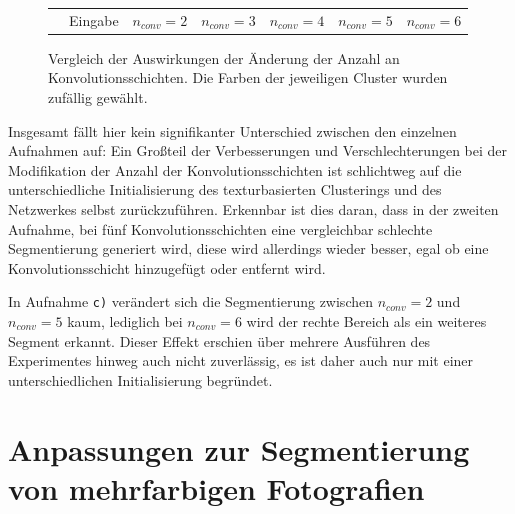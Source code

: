 \begin{figure}[h!]
\begin{tabular}{m{15pt}m{}m{}m{}m{}m{}m{}}
		&
		\vspace*{2pt}\centering Eingabe & 
		\vspace*{2pt}\centering $n_{conv}=2$ &
		\vspace*{2pt}\centering $n_{conv}=3$ &
		\vspace*{2pt}\centering $n_{conv}=4$ &
		\vspace*{2pt}\centering $n_{conv}=5$ &
		\vspace*{2pt}\centering $n_{conv}=6$ 
	\end{tabular}
	\caption{Vergleich der Auswirkungen der Änderung der Anzahl an Konvolutionsschichten. Die Farben der jeweiligen Cluster wurden zufällig gewählt.}
	\label{fig:n_layers_comparision}
\end{figure}

Insgesamt fällt hier kein signifikanter Unterschied zwischen den einzelnen Aufnahmen auf: Ein Großteil der Verbesserungen und Verschlechterungen bei der Modifikation der Anzahl der Konvolutionsschichten ist schlichtweg auf die unterschiedliche Initialisierung des texturbasierten Clusterings und des Netzwerkes selbst zurückzuführen. Erkennbar ist dies daran, dass in der zweiten Aufnahme, bei fünf Konvolutionsschichten eine vergleichbar schlechte Segmentierung generiert wird, diese wird allerdings wieder besser, egal ob eine Konvolutionsschicht hinzugefügt oder entfernt wird.

In Aufnahme \texttt{c)} verändert sich die Segmentierung zwischen $n_{conv}=2$ und $n_{conv}=5$ kaum, lediglich bei $n_{conv}=6$ wird der rechte Bereich als ein weiteres Segment erkannt. Dieser Effekt erschien über mehrere Ausführen des Experimentes hinweg auch nicht zuverlässig, es ist daher auch nur mit einer unterschiedlichen Initialisierung begründet.

\section{Anpassungen zur Segmentierung von mehrfarbigen Fotografien}
\label{sec:color_picture_optimization}

